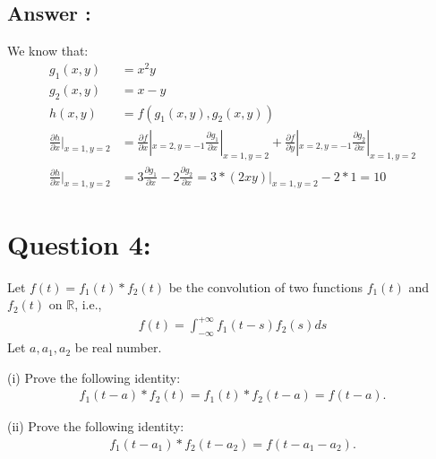 \documentclass[a4paper,12pt]{article}
\newcommand{\R}{\mathbb{R}}
\begin{document}
\subsection*{Answer :}
We know that:
\begin{align*}
    g_1(x, y) &= x^2y \\
    g_2(x, y) &= x - y \\
    h(x, y) &= f(g_1(x, y), g_2(x, y)) \\
    \frac{\partial h}{\partial x}|_{x=1, y=2} &= \frac{\partial f}{\partial x}|_{x=2, y=-1} \frac{\partial g_1}{\partial x}|_{x=1, y=2} + \frac{\partial f}{\partial y}|_{x=2, y=-1} \frac{\partial g_2}{\partial x}|_{x=1, y=2} \\
    \frac{\partial h}{\partial x}|_{x=1, y=2} &= 3\frac{\partial g_1}{\partial x} -2\frac{\partial g_2}{\partial x} = 3 * (2xy)|_{x=1, y=2} - 2 * 1 = 10 
\end{align*}


\section*{Question 4:}
Let \(f(t) = f_1(t) * f_2(t)\) be the convolution of two functions \(f_1(t)\) and \(f_2(t)\) on \(\R\), i.e.,
\begin{align*}
    f(t) = \int_{-\infty}^{+\infty} f_1(t - s)f_2(s)ds
\end{align*}
Let \(a, a_1, a_2\) be real number.

\vspace{1cm}
\noindent
(i) Prove the following identity:
\begin{align*}
    f_1(t-a)*f_2(t) = f_1(t) * f_2(t-a) = f(t-a).
\end{align*}

\noindent
(ii) Prove the following identity:
\begin{align*}
    f_1(t-a_1) * f_2(t-a_2) = f(t-a_1-a_2).
\end{align*}
\end{document}
